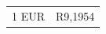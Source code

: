 {\begin{tabular}[t]{|l|l|}
    
        1 EUR &
    
    
        R9,1954%
     \tabularnewline\cline{1-1}\cline{2-2}
    \end{tabular}} %
      \addtocounter{footnote}{-0}
      
    
